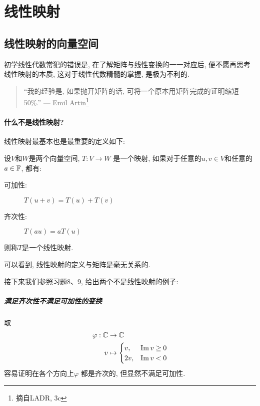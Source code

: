 \chapter{线性映射}
\section{线性映射的向量空间}
初学线性代数常犯的错误是, 在了解矩阵与线性变换的一一对应后, 便不愿再思考线性映射的本质, 这对于线性代数精髓的掌握, 是极为不利的.
\begin{quote}
    ``我的经验是, 如果抛开矩阵的话, 可将一个原本用矩阵完成的证明缩短 50\%.''
    \hfill --- Emil Artin\footnote{摘自LADR, 3c}
\end{quote}
\subsubsection{什么不是线性映射?}
线性映射最基本也是最重要的定义如下:
\begin{definition}
    设\(V\)和\(W\)是两个向量空间, \(T: V \to W\) 是一个映射, 如果对于任意的\(u,
    v \in V\)和任意的\(a \in \mathbb{F}\), 都有:
    \begin{description}
        \item[可加性:] \(T(u+v)=T(u)+T(v)\)
        \item[齐次性:] \(T(a u) = a T(u)\)
    \end{description}
    则称\(T\)是一个线性映射.
\end{definition}
可以看到, 线性映射的定义与矩阵是毫无关系的.

接下来我们参照习题8、9, 给出两个不是线性映射的例子:

\paragraph{满足齐次性不满足可加性的变换}
取
\begin{align*}
    \varphi: \mathbb{C} &\to \mathbb{C} \\
    v &\mapsto
    \begin{cases}
        v, &\operatorname{Im} v \geq 0 \\
        2v, &\operatorname{Im} v < 0
    \end{cases}
\end{align*}
容易证明在各个方向上\(\varphi\) 都是齐次的, 但显然不满足可加性.

